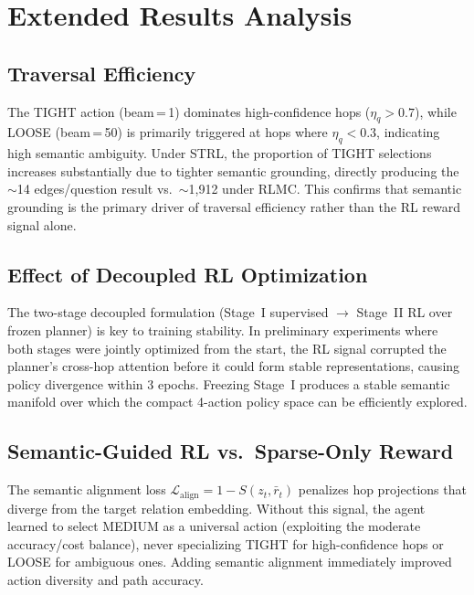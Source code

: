 \documentclass[10pt,conference]{IEEEtran}
\begin{document}
\section{Extended Results Analysis}
\label{app:analysis}

\subsection{Traversal Efficiency}

The TIGHT action (beam\,=\,1) dominates high-confidence hops ($\eta_q > 0.7$), while LOOSE (beam\,=\,50) is primarily triggered at hops where $\eta_q < 0.3$, indicating high semantic ambiguity. Under STRL, the proportion of TIGHT selections increases substantially due to tighter semantic grounding, directly producing the $\sim$14 edges/question result vs.\ $\sim$1,912 under RLMC. This confirms that semantic grounding is the primary driver of traversal efficiency rather than the RL reward signal alone.

\subsection{Effect of Decoupled RL Optimization}

The two-stage decoupled formulation (Stage~I supervised $\to$ Stage~II RL over frozen planner) is key to training stability. In preliminary experiments where both stages were jointly optimized from the start, the RL signal corrupted the planner's cross-hop attention before it could form stable representations, causing policy divergence within 3 epochs. Freezing Stage~I produces a stable semantic manifold over which the compact 4-action policy space can be efficiently explored.

\subsection{Semantic-Guided RL vs.\ Sparse-Only Reward}

The semantic alignment loss $\mathcal{L}_{\text{align}} = 1 - S(z_t, \bar{r}_t)$ penalizes hop projections that diverge from the target relation embedding. Without this signal, the agent learned to select MEDIUM as a universal action (exploiting the moderate accuracy/cost balance), never specializing TIGHT for high-confidence hops or LOOSE for ambiguous ones. Adding semantic alignment immediately improved action diversity and path accuracy.
\end{document}
